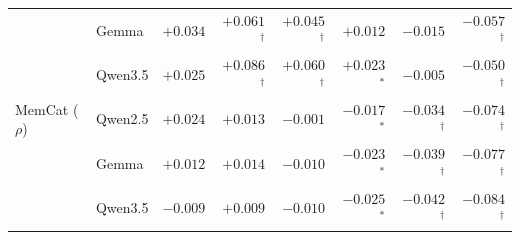 \begin{table}[t]
\begin{tabular}{@{}llrrrrrr@{}}
 & Gemma & $+0.034$ & $+0.061$$^{\dagger}$ & $+0.045$$^{\dagger}$ & $+0.012$ & $-0.015$ & $-0.057$$^{\dagger}$ \\
 & Qwen3.5 & $+0.025$ & $+0.086$$^{\dagger}$ & $+0.060$$^{\dagger}$ & $+0.023$$^{*}$ & $-0.005$ & $-0.050$$^{\dagger}$ \\
\addlinespace
MemCat ($\rho$) & Qwen2.5 & $+0.024$ & $+0.013$ & $-0.001$ & $-0.017$$^{*}$ & $-0.034$$^{\dagger}$ & $-0.074$$^{\dagger}$ \\
 & Gemma & $+0.012$ & $+0.014$ & $-0.010$ & $-0.023$$^{*}$ & $-0.039$$^{\dagger}$ & $-0.077$$^{\dagger}$ \\
 & Qwen3.5 & $-0.009$ & $+0.009$ & $-0.010$ & $-0.025$$^{*}$ & $-0.042$$^{\dagger}$ & $-0.084$$^{\dagger}$ \\
\bottomrule
\end{tabular}
\end{table}
